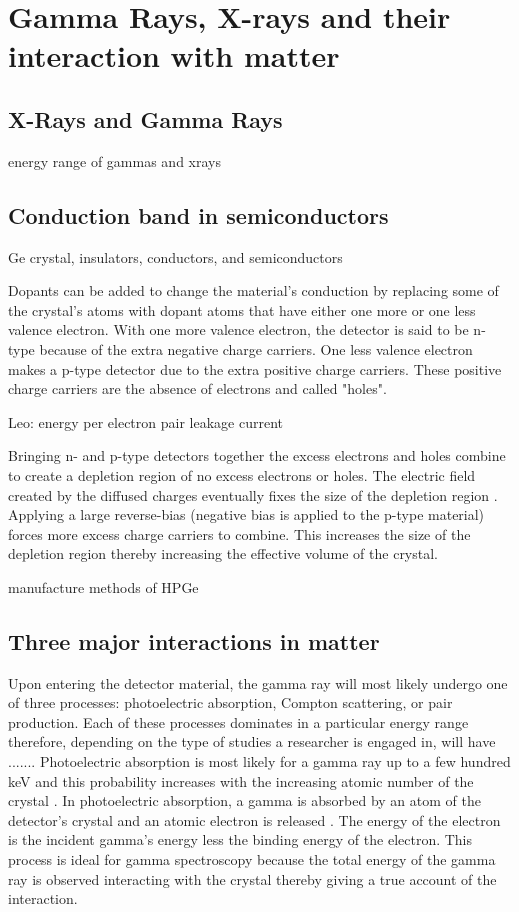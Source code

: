 \chapter{Gamma Rays, X-rays and their interaction with matter}
\label{ch:Gamma Rays, X-rays and their interaction with matter}
\section{X-Rays and Gamma Rays}
\indent energy range of gammas and xrays

\section{Conduction band in semiconductors}
\indent Ge crystal, 
insulators, conductors, and semiconductors

Dopants can be added to change the material's conduction by replacing some of the crystal's atoms with dopant atoms that have either one more or one less valence electron. With one more valence electron, the detector is said to be n-type because of the extra negative charge carriers. One less valence electron makes a p-type detector due to the extra positive charge carriers. These positive charge carriers are the absence of electrons and called "holes".

Leo:
energy per electron pair
leakage current


Bringing n- and p-type detectors together the excess electrons and holes combine to create a depletion region of no excess electrons or holes. The electric field created by the diffused charges eventually fixes the size of the depletion region \cite{KK88}. Applying a large reverse-bias (negative bias is applied to the p-type material) forces more excess charge carriers to combine. This increases the size of the depletion region thereby increasing the effective volume of the crystal. 

manufacture methods of HPGe

\section{Three major interactions in matter}
\indent Upon entering the detector material, the gamma ray will most likely undergo one of three processes: photoelectric absorption, Compton scattering, or pair production. Each of these processes dominates in a particular energy range therefore, depending on the type of studies a researcher is engaged in, will have ....... Photoelectric absorption is most likely for a gamma ray up to a few hundred keV and this probability increases with the increasing atomic number of the crystal \cite{GK00}. In photoelectric absorption, a gamma is absorbed by an atom of the detector's crystal and an atomic electron is released \cite{KK88}. The energy of the electron is the incident gamma's energy less the binding energy of the electron. This process is ideal for gamma spectroscopy because the total energy of the gamma ray is observed interacting with the crystal thereby giving a true account of the interaction. 

